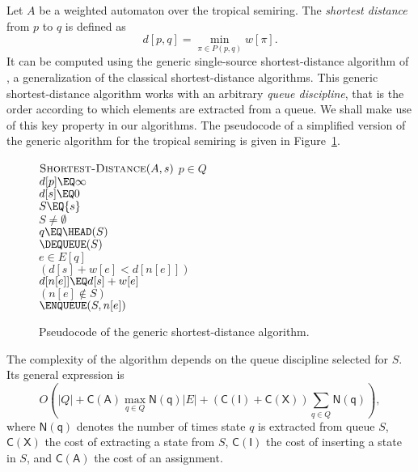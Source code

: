 \documentclass{llncs}
\newcommand{\set}[1]{\{#1\}}
\newcommand{\0}{\overline{0}}
\newcommand{\1}{\overline{1}}
\newcommand{\+}{\oplus}
\renewcommand{\.}{\otimes}
\begin{document}
Let $A$ be a weighted automaton over the tropical semiring. The {\em
shortest distance} from $p$ to $q$ is defined as
\begin{equation}
d[p, q] = \min_{\pi \in P(p, q)} w[\pi].
\end{equation}
It can be computed using the generic single-source shortest-distance
algorithm of \cite{shortest-distance}, a generalization of the
classical shortest-distance algorithms. This generic shortest-distance
algorithm works with an arbitrary \emph{queue discipline}, that is the
order according to which elements are extracted from a queue.  We
shall make use of this key property in our algorithms. The pseudocode
of a simplified version of the generic algorithm for the tropical
semiring is given in Figure~\ref{fig:alg:shortest}.

\begin{figure}[ht]
{\small 
$\mbox{\sc Shortest-Distance}(A,s)$
\bc
\li \FOR \EACH $p \in Q$ \DO\\
\li \> $d[p] \EQ \infty$\\
\li $d[s] \EQ 0$\\
\li $S \EQ \set{s}$\\
\li \WHILE $S \not= \emptyset$ \DO\\
\li \> $q \EQ \HEAD(S)$ \\
\li \> $\DEQUEUE(S)$ \\
\li \> \FOR \EACH $e \in E[q]$ \DO \\
\li \> \> \IF $(d[s] + w[e] < d[n[e]])$ \THEN\\
\li \> \> \> $d[n[e]] \EQ d[s] + w[e]$\\
\li \> \> \> \IF $(n[e] \not\in S)$   \THEN\\
\li \> \> \> \> $\ENQUEUE(S,n[e])$\\
\ec
}
\caption{Pseudocode of the generic shortest-distance algorithm.}
\label{fig:alg:shortest}
\end{figure}

The complexity of the algorithm depends on the queue discipline
selected for $S$. Its general expression is
\begin{equation}
\label{eq:gen_exp}
  O(|Q|+ \mathsf{C(A)} \max_{q \in Q} \mathsf{N(q)} |E| + (\mathsf{C(I)} + 
  \mathsf{C(X)}) \sum_{q\in Q} \mathsf{N(q)}),
\end{equation}
where $\mathsf{N(q)}$ denotes the number of times state $q$ is
extracted from queue $S$, $\mathsf{C(X)}$ the cost of extracting a
state from $S$, $\mathsf{C(I)}$ the cost of inserting a state in $S$,
and $\mathsf{C(A)}$ the cost of an assignment.
\end{document}
